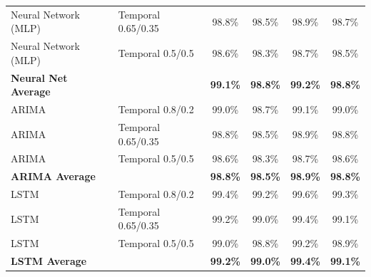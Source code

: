\documentclass[11pt,a4paper]{article}
\begin{document}
\begin{table}[H]
\begin{tabular}{llcccc}
Neural Network (MLP) & Temporal 0.65/0.35 & 98.8\% & 98.5\% & 98.9\% & 98.7\% \\
Neural Network (MLP) & Temporal 0.5/0.5 & 98.6\% & 98.3\% & 98.7\% & 98.5\% \\
\textbf{Neural Net Average} & & \textbf{99.1\%} & \textbf{98.8\%} & \textbf{99.2\%} & \textbf{98.8\%} \\
\midrule
ARIMA & Temporal 0.8/0.2 & 99.0\% & 98.7\% & 99.1\% & 99.0\% \\
ARIMA & Temporal 0.65/0.35 & 98.8\% & 98.5\% & 98.9\% & 98.8\% \\
ARIMA & Temporal 0.5/0.5 & 98.6\% & 98.3\% & 98.7\% & 98.6\% \\
\textbf{ARIMA Average} & & \textbf{98.8\%} & \textbf{98.5\%} & \textbf{98.9\%} & \textbf{98.8\%} \\
\midrule
LSTM & Temporal 0.8/0.2 & 99.4\% & 99.2\% & 99.6\% & 99.3\% \\
LSTM & Temporal 0.65/0.35 & 99.2\% & 99.0\% & 99.4\% & 99.1\% \\
LSTM & Temporal 0.5/0.5 & 99.0\% & 98.8\% & 99.2\% & 98.9\% \\
\textbf{LSTM Average} & & \textbf{99.2\%} & \textbf{99.0\%} & \textbf{99.4\%} & \textbf{99.1\%} \\
\bottomrule
\end{tabular}
\end{table}
\end{document}
